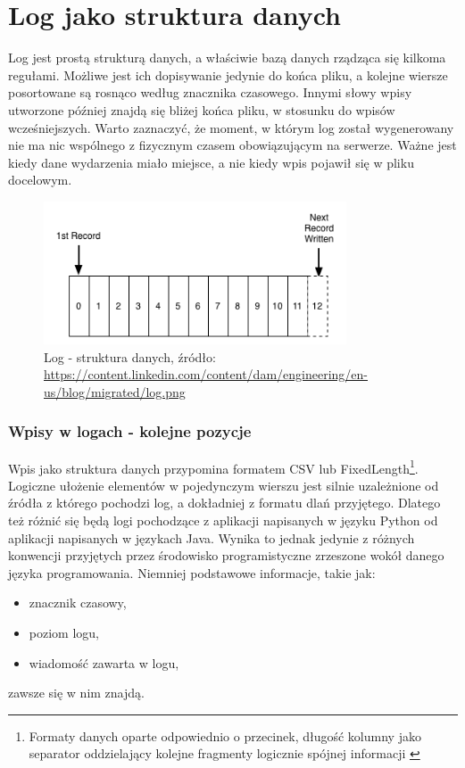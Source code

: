 \section{Log jako struktura danych}
\label{chapter:logs:structure}
    Log jest prostą strukturą danych, a właściwie bazą danych rządząca się kilkoma regułami.
    Możliwe jest ich dopisywanie jedynie do końca pliku, a kolejne wiersze posortowane są rosnąco
    według znacznika czasowego. Innymi słowy wpisy utworzone później znajdą się bliżej końca pliku,
    w stosunku do wpisów wcześniejszych. Warto zaznaczyć, że moment, w którym log został wygenerowany nie ma
    nic wspólnego z fizycznym czasem obowiązującym na serwerze. Ważne jest kiedy dane wydarzenia
    miało miejsce, a nie kiedy wpis pojawił się w pliku docelowym.
    
     \begin{figure}[H]
         \centering
         \includegraphics[width=0.80\textwidth]{images/log_file_structure}
         \caption[Log jako struktura danych]{
             Log - struktura danych, źródło: \url{https://content.linkedin.com/content/dam/engineering/en-us/blog/migrated/log.png}
            }
            \label{chapter:logs:history:log_file_as_data_structure_picture}
    \end{figure}

    \subsubsection{Wpisy w logach - kolejne pozycje}
    \label{chapter:logs:structure:record_structure}
    Wpis jako struktura danych przypomina formatem CSV lub FixedLength\footnote{Formaty danych oparte odpowiednio o przecinek, długość kolumny 
        jako separator oddzielający kolejne fragmenty logicznie spójnej informacji \cite{csv_definition}}. 
    Logiczne ułożenie elementów w pojedynczym wierszu jest silnie uzależnione od źródła z którego pochodzi log, 
    a dokładniej z formatu dlań przyjętego. Dlatego też różnić się będą logi pochodzące z aplikacji napisanych w języku Python od aplikacji napisanych w językach Java. Wynika to jednak jedynie z różnych konwencji przyjętych przez środowisko 
    programistyczne zrzeszone wokół danego języka programowania. Niemniej podstawowe informacje, takie jak:
    \begin{itemize}
        \item znacznik czasowy,
        \item poziom logu,
        \item wiadomość zawarta w logu,
    \end{itemize}
    zawsze się w nim znajdą. 
    
